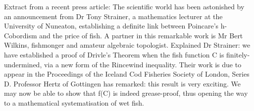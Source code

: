 \documentclass{article}
\begin{document}
Extract from a recent press article:
The scientific world has been astonished by an announcement from 
Dr Tony Strainer, a mathematics lecturer at the
University of Nuneaton, establishing a definite link between
Poincare's h-Cobordism and the price of fish. A partner in this
remarkable work is Mr Bert Wilkins, fishmonger and amateur
algebraic topologist. Explained Dr Strainer: we have
established a proof of Drivle's Theorem when the fish function C 
is finitely-undermined,
via a new form of the Rincewind inequality. Their 
work is due to appear in the Proceedings of the Iceland Cod Fisheries
Society of London, Series D.
Professor Hertz of Gottingen has remarked: this result is
very exciting. We may now be able to show that f(C) is indeed
grease-proof, thus opening the way to a mathematical systematisation
of wet fish.
\end{document}
